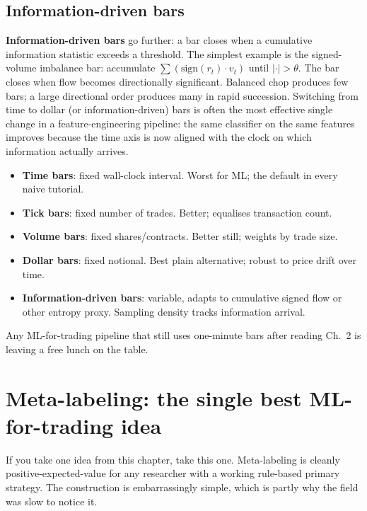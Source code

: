 \subsection{Information-driven bars}
\label{subsec:ml_info_bars}

\textbf{Information-driven bars} go further: a bar closes when a
cumulative information statistic exceeds a threshold. The
simplest example is the signed-volume imbalance bar: accumulate
$\sum (\text{sign}(r_t) \cdot v_t)$ until $|\cdot| > \theta$. The
bar closes when flow becomes directionally significant. Balanced
chop produces few bars; a large directional order produces many
in rapid succession. Switching from time to dollar (or
information-driven) bars is often the most effective single change in
a feature-engineering pipeline: the same classifier on the same
features improves because the time axis is now aligned with the
clock on which information actually arrives.

\begin{keyfactbox}
\begin{itemize}
  \item \textbf{Time bars}: fixed wall-clock interval. Worst
  for ML; the default in every naive tutorial.
  \item \textbf{Tick bars}: fixed number of trades. Better;
  equalises transaction count.
  \item \textbf{Volume bars}: fixed shares/contracts. Better
  still; weights by trade size.
  \item \textbf{Dollar bars}: fixed notional. Best plain
  alternative; robust to price drift over time.
  \item \textbf{Information-driven bars}: variable, adapts to
  cumulative signed flow or other entropy proxy. Sampling
  density tracks information arrival.
\end{itemize}
Any ML-for-trading pipeline that still uses one-minute bars
after reading \citeAFML{} Ch.~2 is leaving a free lunch on the
table.
\end{keyfactbox}

\section{Meta-labeling: the single best ML-for-trading idea}
\label{sec:ml_metalabel}

If you take one idea from this chapter, take this one.
Meta-labeling is cleanly positive-expected-value for any
researcher with a working rule-based primary strategy. The
construction is embarrassingly simple, which is partly why the
field was slow to notice it.

